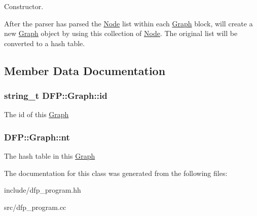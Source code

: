 Constructor. 

After the parser has parsed the \hyperlink{class_d_f_p_1_1_node}{Node} list within each \hyperlink{class_d_f_p_1_1_graph}{Graph} block, will create a new \hyperlink{class_d_f_p_1_1_graph}{Graph} object by using this collection of \hyperlink{class_d_f_p_1_1_node}{Node}. The original list will be converted to a hash table. 

\subsection{Member Data Documentation}
\subsubsection[{\texorpdfstring{id}{id}}]{\setlength{\rightskip}{0pt plus 5cm}string\+\_\+t D\+F\+P\+::\+Graph\+::id}\hypertarget{class_d_f_p_1_1_graph_aa5ed385b1f994f5220e0bb3d290bcfb8}{}\label{class_d_f_p_1_1_graph_aa5ed385b1f994f5220e0bb3d290bcfb8}
The id of this \hyperlink{class_d_f_p_1_1_graph}{Graph} 
\subsubsection[{\texorpdfstring{nt}{nt}}]{ D\+F\+P\+::\+Graph\+::nt}\hypertarget{class_d_f_p_1_1_graph_a71f3f7d9daf86c8c903f9a0f9428d67d}{}\label{class_d_f_p_1_1_graph_a71f3f7d9daf86c8c903f9a0f9428d67d}
The hash table in this \hyperlink{class_d_f_p_1_1_graph}{Graph} 

The documentation for this class was generated from the following files\+:\begin{DoxyCompactItemize}
\item 
include/dfp\+\_\+program.\+hh\item 
src/dfp\+\_\+program.\+cc\end{DoxyCompactItemize}

